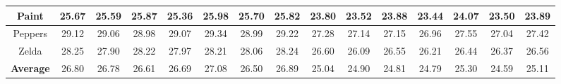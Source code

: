 \begin{table}[t]
\begin{center}
\begin{tabular}{|c||c|c|c|c|c|c|c||c|c|c|c|c|c|c|}
\\
\hline
 Paint & 25.67 & 25.59 & 25.87 & 25.36 &25.98&25.70 & 25.82     &  23.80 & 23.52 &  23.88 & 23.44 &24.07 &23.50  & 23.89  
\\
\hline
 Peppers & 29.12 & 29.06 & 28.98 & 29.07 & 29.34&28.99 & 29.22     & 27.28 & 27.14 &  27.15 & 26.96 &  27.55   &27.04&  27.42
\\
\hline
 Zelda  & 28.25 & 27.90 & 28.22 & 27.97 & 28.21 & 28.06& 28.24       & 26.60 & 26.09 &  26.55  & 26.21  & 26.44  &26.37& 26.56
\\
\hline
 \textbf{Average}& 26.80 &  26.78 &  26.61  & 26.69  & 27.08& 26.50 & 26.89    &25.04 &24.90 &24.81 &24.79 &25.30 &24.59 &25.11     
\\
\hline
\end{tabular}
\end{center}
\end{table}

